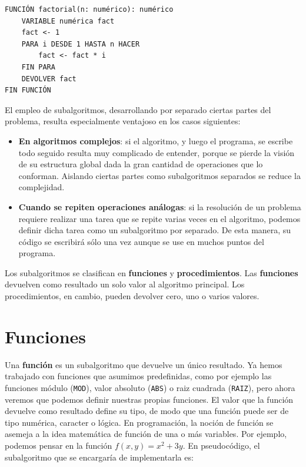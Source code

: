 \documentclass[]{book}
\providecommand{\tightlist}{%
  \setlength{\itemsep}{0pt}\setlength{\parskip}{0pt}}
\begin{document}
\begin{verbatim}
FUNCIÓN factorial(n: numérico): numérico
    VARIABLE numérica fact
    fact <- 1
    PARA i DESDE 1 HASTA n HACER
        fact <- fact * i
    FIN PARA
    DEVOLVER fact
FIN FUNCIÓN
\end{verbatim}

El empleo de subalgoritmos, desarrollando por separado ciertas partes del problema, resulta especialmente ventajoso en los casos siguientes:

\begin{itemize}
\tightlist
\item
  \textbf{En algoritmos complejos}: si el algoritmo, y luego el programa, se escribe todo seguido resulta muy complicado de entender, porque se pierde la visión de su estructura global dada la gran cantidad de operaciones que lo conforman. Aislando ciertas partes como subalgoritmos separados se reduce la complejidad.
\item
  \textbf{Cuando se repiten operaciones análogas}: si la resolución de un problema requiere realizar una tarea que se repite varias veces en el algoritmo, podemos definir dicha tarea como un subalgoritmo por separado. De esta manera, su código se escribirá sólo una vez aunque se use en muchos puntos del programa.
\end{itemize}

Los subalgoritmos se clasifican en \textbf{funciones} y \textbf{procedimientos}. Las \textbf{funciones} devuelven como resultado un solo valor al algoritmo principal. Los procedimientos, en cambio, pueden devolver cero, uno o varios valores.

\hypertarget{funciones}{%
\section{Funciones}\label{funciones}}

Una \textbf{función} es un subalgoritmo que devuelve un único resultado. Ya hemos trabajado con funciones que asumimos predefinidas, como por ejemplo las funciones módulo (\texttt{MOD}), valor absoluto (\texttt{ABS}) o raiz cuadrada (\texttt{RAIZ}), pero ahora veremos que podemos definir nuestras propias funciones. El valor que la función devuelve como resultado define su tipo, de modo que una función puede ser de tipo numérica, caracter o lógica. En programación, la noción de función se asemeja a la idea matemática de función de una o más variables. Por ejemplo, podemos pensar en la función \(f(x, y) = x^2 + 3y\). En pseudocódigo, el subalgoritmo que se encargaría de implementarla es:
\end{document}
